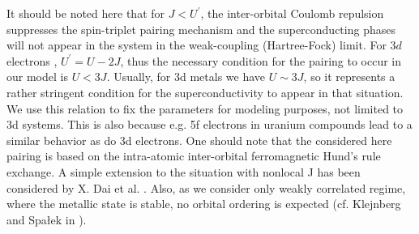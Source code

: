 \documentclass[aps,prb,showpacs,reprint]{revtex4-1}
\begin{document}
It should be noted here that for $J<U^{\prime}$, the inter-orbital Coulomb
repulsion suppresses the spin-triplet pairing mechanism and the superconducting
phases will not appear in the system in the weak-coupling (Hartree-Fock) limit.
For $3d$ electrons \cite{Sugano},
$U^{\prime}=U-2J$, thus the
necessary condition for the pairing to occur in our model
is $U<3J$. Usually, for 3d metals we have $U\sim 3J$, so it represents a rather stringent condition for the superconductivity to appear in that situation. We use this relation to fix the parameters for modeling purposes, not limited to 3d systems. This is also because e.g. 5f electrons in uranium compounds lead to a similar behavior as do 3d electrons. One should note that the considered here pairing is based on the intra-atomic inter-orbital ferromagnetic Hund's rule exchange. A simple extension to the situation with nonlocal J has been considered by X. Dai et al. \cite{Puetter2003}. Also, as we consider only weakly correlated regime, where the metallic state is stable, no orbital ordering is expected (cf. Klejnberg and Spa\l ek in \cite{Spalek2001}).
\end{document}

